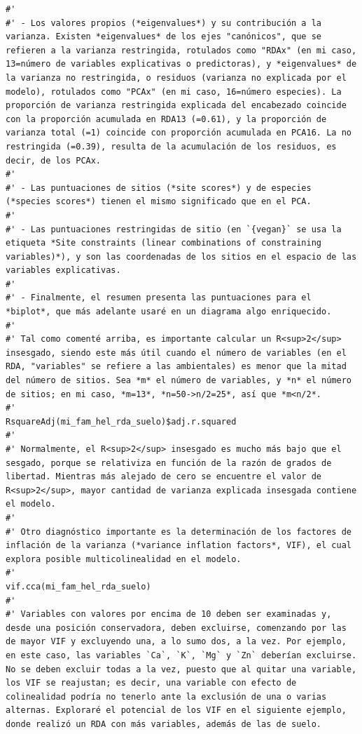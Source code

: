 \documentclass[11pt,]{article}
\begin{document}
\begin{verbatim}
#' 
#' - Los valores propios (*eigenvalues*) y su contribución a la varianza. Existen *eigenvalues* de los ejes "canónicos", que se refieren a la varianza restringida, rotulados como "RDAx" (en mi caso, 13=número de variables explicativas o predictoras), y *eigenvalues* de la varianza no restringida, o residuos (varianza no explicada por el modelo), rotulados como "PCAx" (en mi caso, 16=número especies). La proporción de varianza restringida explicada del encabezado coincide con la proporción acumulada en RDA13 (=0.61), y la proporción de varianza total (=1) coincide con proporción acumulada en PCA16. La no restringida (=0.39), resulta de la acumulación de los residuos, es decir, de los PCAx.
#' 
#' - Las puntuaciones de sitios (*site scores*) y de especies (*species scores*) tienen el mismo significado que en el PCA.
#' 
#' - Las puntuaciones restringidas de sitio (en `{vegan}` se usa la etiqueta *Site constraints (linear combinations of constraining variables)*), y son las coordenadas de los sitios en el espacio de las variables explicativas.
#' 
#' - Finalmente, el resumen presenta las puntuaciones para el *biplot*, que más adelante usaré en un diagrama algo enriquecido.
#' 
#' Tal como comenté arriba, es importante calcular un R<sup>2</sup> insesgado, siendo este más útil cuando el número de variables (en el RDA, "variables" se refiere a las ambientales) es menor que la mitad del número de sitios. Sea *m* el número de variables, y *n* el número de sitios; en mi caso, *m=13*, *n=50->n/2=25*, así que *m<n/2*.
#' 
RsquareAdj(mi_fam_hel_rda_suelo)$adj.r.squared
#' 
#' Normalmente, el R<sup>2</sup> insesgado es mucho más bajo que el sesgado, porque se relativiza en función de la razón de grados de libertad. Mientras más alejado de cero se encuentre el valor de R<sup>2</sup>, mayor cantidad de varianza explicada insesgada contiene el modelo.
#' 
#' Otro diagnóstico importante es la determinación de los factores de inflación de la varianza (*variance inflation factors*, VIF), el cual explora posible multicolinealidad en el modelo.
#' 
vif.cca(mi_fam_hel_rda_suelo)
#' 
#' Variables con valores por encima de 10 deben ser examinadas y, desde una posición conservadora, deben excluirse, comenzando por las de mayor VIF y excluyendo una, a lo sumo dos, a la vez. Por ejemplo, en este caso, las variables `Ca`, `K`, `Mg` y `Zn` deberían excluirse. No se deben excluir todas a la vez, puesto que al quitar una variable, los VIF se reajustan; es decir, una variable con efecto de colinealidad podría no tenerlo ante la exclusión de una o varias alternas. Exploraré el potencial de los VIF en el siguiente ejemplo, donde realizó un RDA con más variables, además de las de suelo.

\end{verbatim}
\end{document}
